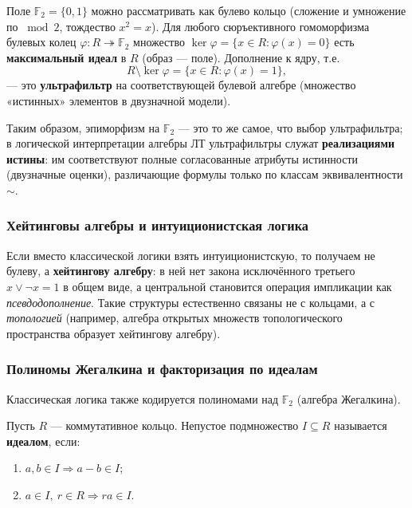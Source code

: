 \documentclass[11pt, a4paper]{extarticle}
\begin{document}
\begin{remark}
Поле $\mathbb{F}_2 = \{0,1\}$ можно рассматривать как булево кольцо (сложение и умножение по $\bmod 2$, тождество $x^2=x$).
Для любого сюръективного гомоморфизма булевых колец $\varphi \colon R \twoheadrightarrow \mathbb{F}_2$ множество
$\ker \varphi = \{ x \in R : \varphi(x)=0 \}$ есть \textbf{максимальный идеал} в $R$ (образ --- поле).
Дополнение к ядру, т.е.
$$
R \setminus \ker\varphi = \{ x \in R : \varphi(x)=1 \},
$$
--- это \textbf{ультрафильтр} на соответствующей булевой алгебре (множество «истинных» элементов в двузначной модели).

Таким образом, эпиморфизм на $\mathbb{F}_2$ --- это то же самое, что выбор ультрафильтра; в логической интерпретации алгебры ЛТ ультрафильтры служат \textbf{реализациями истины}: им соответствуют полные согласованные атрибуты истинности (двузначные оценки), различающие формулы только по классам эквивалентности $\sim$.
\end{remark}

\subsubsection{Хейтинговы алгебры и интуиционистская логика}

Если вместо классической логики взять интуиционистскую, то получаем не булеву, а \textbf{хейтингову алгебру}: в ней нет закона исключённого третьего $x\vee \neg x = 1$ в общем виде, а центральной становится операция импликации как \emph{псевдодополнение}. Такие структуры естественно связаны не с кольцами, а с \emph{топологией} (например, алгебра открытых множеств топологического пространства образует хейтингову алгебру).

\subsubsection{Полиномы Жегалкина и факторизация по идеалам}

Классическая логика также кодируется полиномами над $\mathbb{F}_2$ (алгебра Жегалкина).

\begin{definition}
Пусть $R$ --- коммутативное кольцо. Непустое подмножество $I \subseteq R$ называется \textbf{идеалом}, если:
\begin{enumerate}[label=(\roman*), nosep]
    \item $a,b\in I \Rightarrow a-b\in I$;
    \item $a\in I,\ r\in R \Rightarrow ra\in I$.
\end{enumerate}
\end{definition}
\end{document}
